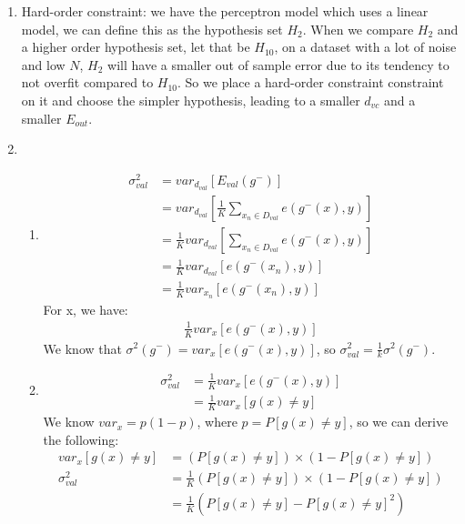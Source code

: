 \documentclass{article}
\begin{document}
\begin{enumerate}
        \item Hard-order constraint: we have the perceptron model which uses a linear model, we can define this as the hypothesis set $H_2$. When we compare $H_2$ and a higher order hypothesis set, let that be $H_{10}$, on a dataset with a lot of noise and low $N$, $H_2$ will have a smaller out of sample error due to its tendency to not overfit compared to $H_{10}$. So we place a hard-order constraint constraint on it and choose the simpler hypothesis, leading to a smaller $d_{vc}$ and a smaller $E_{out}$.
        \item \begin{enumerate}[label=(\alph*)]
            \item \begin{align*}
                \sigma^2_{val} &= var_{d_{val}}[E_{val}(g^-)]\\
                &= var_{d_{val}}[\frac{1}{K}\sum_{x_n \in D_{val}}^{} e(g^-(x), y)]\\
                &= \frac{1}{K}var_{d_{val}}[\sum_{x_n \in D_{val}}^{} e(g^-(x), y)]\\
                &= \frac{1}{K}var_{d_{val}}[e(g^-(x_n), y)]\\
                &= \frac{1}{K}var_{x_n}[e(g^-(x_n), y)]
            \end{align*}
            For x, we have:
            \begin{align*}
                \frac{1}{K}var_x[e(g^-(x), y)]
            \end{align*}
            We know that $\sigma^2(g^-) = var_x[e(g^-(x), y)]$, so $\sigma^2_{val} = \frac{1}{k}\sigma^2(g^-)$.
            \item \begin{align*}
                \sigma^2_{val} &= \frac{1}{K}var_{x}[e(g^-(x), y)]\\
                &= \frac{1}{K}var_x[g(x) \neq y]
            \end{align*}
            We know $var_x = p(1-p)$, where $p = P[g(x) \neq y]$, so we can derive the following:
            \begin{align*}
                var_x[g(x) \neq y] &= (P[g(x) \neq y]) \times (1 - P[g(x) \neq y])\\
                \sigma^2_{val} &= \frac{1}{K} (P[g(x) \neq y]) \times (1 - P[g(x) \neq y])\\
                &= \frac{1}{K}(P[g(x) \neq y] - P[g(x) \neq y]^2)
            \end{align*}


\end{enumerate}
\end{enumerate}
\end{document}
